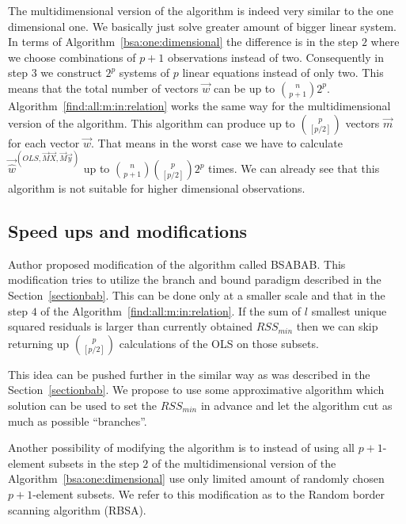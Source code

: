 The multidimensional version of the algorithm is indeed very similar to the one dimensional one. We basically just solve greater amount of bigger linear system. In terms of Algorithm~\ref{bsa:one:dimensional} the difference is in the step $2$ where we choose combinations of $p+1$ observations instead of two. Consequently in step $3$ we construct $2^p$ systems of $p$ linear equations instead of only two. This means that the total number of vectors $\vec{w}$ can be up to $\binom{n}{p+1} 2^p$. Algorithm~\ref{find:all:m:in:relation} works the same way for the multidimensional version of the algorithm. This algorithm can produce up to $\binom{p}{[p/2]}$ vectors $\vec{m}$ for each vector $\vec{w}$. That means in the worst case we have to calculate 
$\vec{\hat{w}}^{(OLS,\vec{M}\vec{X}, \vec{M}\vec{y})}$ up to $\binom{n}{p+1} \binom{p}{[p/2]} 2^p$ times. We can already see that this algorithm is not suitable for higher dimensional observations.


\subsection{Speed ups and modifications}
Author proposed modification of the algorithm called BSABAB. This modification tries to utilize the branch and bound paradigm described in the Section~\ref{sectionbab}. This can be done only at a smaller scale and that in the step $4$ of the Algorithm~\ref{find:all:m:in:relation}. If the sum of $l$ smallest unique squared residuals is larger than currently obtained $RSS_{min}$ then we can skip returning up  $\binom{p}{[p/2]}$ calculations of the OLS on those subsets.

This idea can be pushed further in the similar way as was described in the Section~\ref{sectionbab}. We propose to use some approximative algorithm which solution can be used to set the $RSS_{min}$ in advance and let the algorithm cut as much as possible ``branches''.

Another possibility  of modifying the algorithm is to instead of using all $p+1$-element subsets in the step $2$ of the multidimensional version of the Algorithm~\ref{bsa:one:dimensional} use only limited amount of randomly chosen $p+1$-element subsets. We refer to this modification as to the Random border scanning algorithm (RBSA).